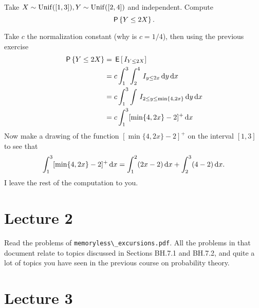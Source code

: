 \begin{exercise}\label{ex:2}
Take $X\sim\mathrm{Unif}([1,3]), Y\sim\mathrm{Unif}([2,4])$ and independent. Compute
\begin{equation}
  \label{eq:24}
\P{Y\leq 2X}.
\end{equation}
\begin{solution}
Take $c$ the normalization constant (why is $c=1/4$), then using the previous exercise
\begin{align}
\,\mathsf{P}\left\{Y\leq 2X\right\}
&=\,\mathsf{E}\left[\,I_{Y\leq 2X}\right] \\
&=c \int_{1}^{3}\int_{2}^{4} \,I_{y\leq 2x} \,\textrm{d}y \,\textrm{d}x \\
&=c \int_{1}^{3}\int \,I_{2\leq y\leq \min\{4,2x\}}  \,\textrm{d}y \,\textrm{d}x \\
&=c \int_{1}^{3} [\min\{4, 2x\} -2]^{+} \,\textrm{d}x
\end{align}
Now make a drawing of the function $[\min\{4, 2x\} - 2]^{+}$ on the interval $[1,3]$ to see that
\begin{equation}
\int_{1}^{3} [\min\{4, 2x\} -2]^{+} \,\textrm{d}x = \int_{1}^{2} (2x -2) \,\textrm{d}x + \int_{2}^{3} (4 -2) \,\textrm{d}x.
\end{equation}
I leave the rest of the computation to you.
\end{solution}
\end{exercise}


\section{Lecture 2}

Read the problems of \verb|memoryless\_excursions.pdf|.
All the problems in that document relate to topics discussed in Sections BH.7.1 and BH.7.2, and quite a lot of topics you have seen in the previous course on probability theory.


\section{Lecture 3}




